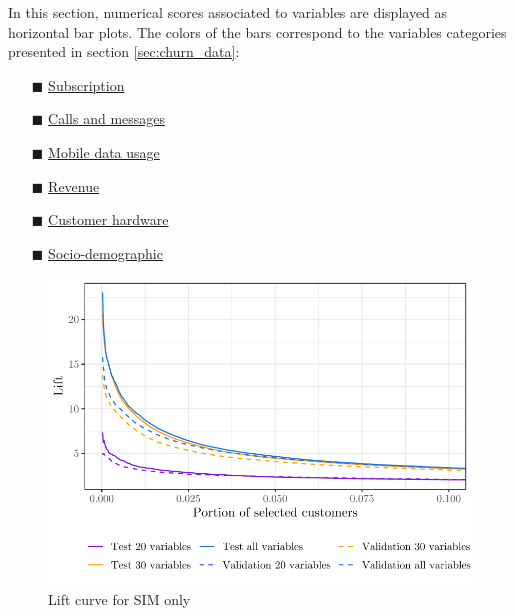 In this section, numerical scores associated to variables are displayed as
horizontal bar plots. The colors of the bars correspond to the variables
categories presented in section \ref{sec:churn_data}:

\begin{itemize}
    \item[\color{themeyellow}$\blacksquare$] \ul{Subscription}
    \item[\color{themeblue}$\blacksquare$] \ul{Calls and messages}
    \item[\color{darkerblue}$\blacksquare$] \ul{Mobile data usage}
    \item[\color{themepurple}$\blacksquare$] \ul{Revenue}
    \item[\color{darkerorange}$\blacksquare$] \ul{Customer hardware}
    \item[\color{themeorange}$\blacksquare$] \ul{Socio-demographic}
\end{itemize}

\begin{figure}
    \centering
    \includegraphics[width=0.9\linewidth]{figures/lift_simo.pdf}
    \caption{Lift curve for SIM only}
    \label{fig:lift_simo}
\end{figure}

